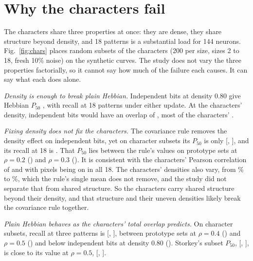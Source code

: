 \section{Why the characters fail}
\label{sec:why}

The characters share three properties at once: they are dense, they share structure beyond density, and 18 patterns is a substantial load for 144 neurons. Fig.~\ref{fig:chars} places random subsets of the characters (200 per size, sizes 2 to 18, fresh 10\% noise) on the synthetic curves. The study does not vary the three properties factorially, so it cannot say how much of the failure each causes. It can say what each does alone.

\emph{Density is enough to break plain Hebbian.} Independent bits at density 0.80 give Hebbian $P_{50}$ , with recall  at 18 patterns under either update. At the characters' density, independent bits would have an overlap of , most of the characters' .

\emph{Fixing density does not fix the characters.} The covariance rule removes the density effect on independent bits, yet on character subsets its $P_{50}$ is only  [, ], and its recall at 18 is . That $P_{50}$ lies between the rule's values on prototype sets at $\rho = 0.2$ () and $\rho = 0.3$ (). It is consistent with the characters' Pearson correlation of  and with  pixels being on in all 18. The characters' densities also vary, from \% to \%, which the rule's single mean does not remove, and the study did not separate that from shared structure. So the characters carry shared structure beyond their density, and that structure and their uneven densities likely break the covariance rule together.

\emph{Plain Hebbian behaves as the characters' total overlap predicts.} On character subsets, recall at three patterns is  [, ], between prototype sets at $\rho = 0.4$ () and $\rho = 0.5$ () and below independent bits at density 0.80 (). Storkey's subset $P_{50}$,  [, ], is close to its value at $\rho = 0.5$,  [, ].

